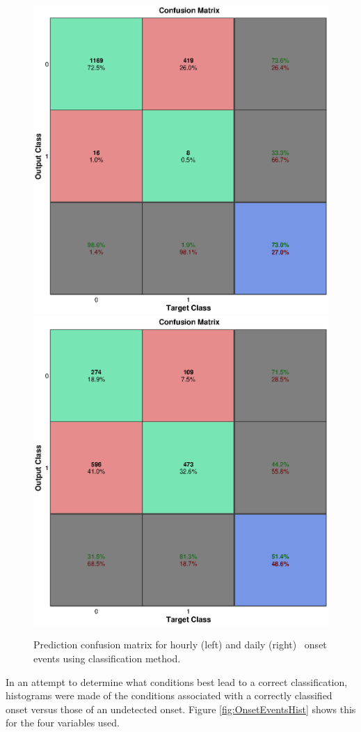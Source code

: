 \begin{figure}[htp!]
	\centering
	\includegraphics[width=0.45\linewidth]{Figures/CH5/NNBinaryOnset-hourly.eps}
	\includegraphics[width=0.45\linewidth]{Figures/CH5/NNBinaryOnset-daily.eps}
	\caption{Prediction confusion matrix for hourly (left) and daily (right) \req\ onset events using classification method.}
	\label{fig:OnsetEvents}
\end{figure}

In an attempt to determine what conditions best lead to a correct classification, histograms were made of the conditions associated with a correctly classified onset versus those of an undetected onset. Figure \ref{fig:OnsetEventsHist} shows this for the four variables used.


